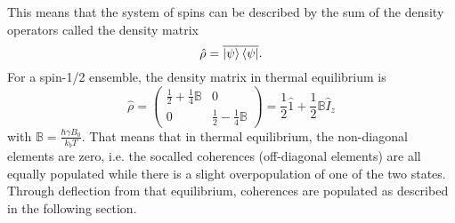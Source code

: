             This means that the system of spins can be described by the sum of the density operators called
            the density matrix
            \begin{equation}
                \hat\rho = \overline{\ket\psi\bra\psi}.
            \end{equation}
            For a spin-1/2 ensemble, the density matrix in thermal equilibrium is
            \begin{equation}
                \hat \rho = \begin{pmatrix} \frac{1}{2}+\frac{1}{4}\mathbb{B}& 0\\ 0&
                \frac{1}{2}-\frac{1}{4}\mathbb{B}\end{pmatrix} = \frac {1}{2} \hat1 + \frac{1}{2} \mathbb{B}
                \hat I_z
            \end{equation}
            with $\mathbb{B} = \frac{\hbar\gamma B_0}{k_b T}$. That means that in thermal equilibrium, the
            non-diagonal elements are zero, i.e. the socalled coherences (off-diagonal elements) are all
            equally populated while there is a slight overpopulation of one of the two states. Through deflection from that
            equilibrium, coherences are populated as described in the following section.
